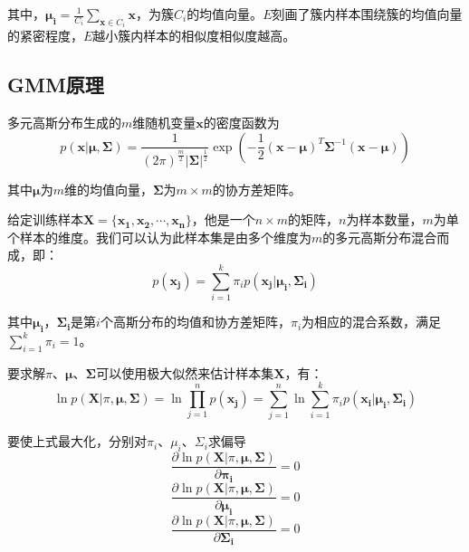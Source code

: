 \documentclass[withoutpreface,bwprint]{cumcmthesis}
\begin{document}
其中，$\boldsymbol{\mu_{i}}=\frac{1}{C_{i}}\sum_{\boldsymbol{x}\in C_{i}}\boldsymbol{x}$，为簇$C_{i}$的均值向量。$E$刻画了簇内样本围绕簇的均值向量的紧密程度，$E$越小簇内样本的相似度相似度越高。

\subsection{GMM原理}
多元高斯分布生成的$m$维随机变量$\boldsymbol{x}$的密度函数为
\begin{equation*}
p(\boldsymbol{x}|\boldsymbol{\mu},\boldsymbol{\Sigma})=\frac{1}{(2\pi)^{\frac{m}{2}}\left|\boldsymbol{\Sigma}\right|^{\frac{1}{2}}}\exp{(-\frac{1}{2}(\boldsymbol{x}-\boldsymbol{\mu})^{T}\boldsymbol{\Sigma}^{-1}(\boldsymbol{x}-\boldsymbol{\mu}))}
\end{equation*}

其中$\boldsymbol{\mu}$为$m$维的均值向量，$\boldsymbol{\Sigma}$为$m\times m$的协方差矩阵。

给定训练样本$\boldsymbol{X}=\{\boldsymbol{x_{1}},\boldsymbol{x_{2}},\cdots,\boldsymbol{x_{n}}\}$，他是一个$n\times m$的矩阵，$n$为样本数量，$m$为单个样本的维度。我们可以认为此样本集是由多个维度为$m$的多元高斯分布混合而成，即：
\begin{equation*}
p(\boldsymbol{x_{j}})=\sum_{i=1}^{k}\pi_{i} p(\boldsymbol{x_{j}}|\boldsymbol{\mu_{i}},\boldsymbol{\Sigma_{i}})
\end{equation*}

其中$\boldsymbol{\mu_{i}}$，$\boldsymbol{\Sigma_{i}}$是第$i$个高斯分布的均值和协方差矩阵，$\pi_{i}$为相应的混合系数，满足$\sum_{i=1}^{k}\pi_{i}=1$。

要求解$\pi$、$\boldsymbol{\mu}$、$\boldsymbol{\Sigma}$可以使用极大似然来估计样本集$\boldsymbol{X}$，有：
\begin{equation*}
\ln p(\boldsymbol{X}|\pi,\boldsymbol{\mu},\boldsymbol{\Sigma})=\ln \prod_{j=1}^{n} p(\boldsymbol{x_{j}})=\sum_{j=1}^{n}\ln \sum_{i=1}^{k}\pi_{i}p(\boldsymbol{x_{i}}|\boldsymbol{\mu_{i}},\boldsymbol{\Sigma_{i}})
\end{equation*}

要使上式最大化，分别对$\pi_{i}$、$\mu_{i}$、$\Sigma_{i}$求偏导
\begin{equation*}
\frac{\partial{\ln p(\boldsymbol{X}|\pi,\boldsymbol{\mu},\boldsymbol{\Sigma})}}{\partial{\boldsymbol{\pi_{i}}}}=0
\end{equation*}
\begin{equation*}
\frac{\partial{\ln p(\boldsymbol{X}|\pi,\boldsymbol{\mu},\boldsymbol{\Sigma})}}{\partial{\boldsymbol{\mu_{i}}}}=0
\end{equation*}
\begin{equation*}
\frac{\partial{\ln p(\boldsymbol{X}|\pi,\boldsymbol{\mu},\boldsymbol{\Sigma})}}{\partial{\boldsymbol{\Sigma_{i}}}}=0
\end{equation*}
\end{document}
